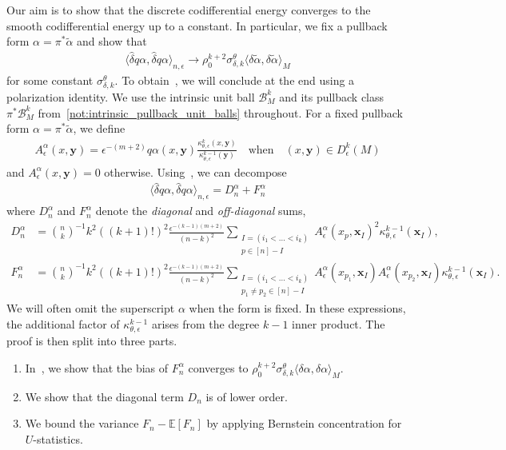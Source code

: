 \documentclass[11pt,reqno]{amsproc}
\numberwithin{equation}{section}
\newcommand{\E}{\mathbb{E}}
\newcommand{\bx}{\mathbf{x}}
\newcommand{\by}{\mathbf{y}}
\newcommand{\cB}{\mathcal{B}}
\newcommand{\talpha}{\tilde{\alpha}}
\newcommand{\hdelta}{\hat{\delta}}
\theoremstyle{definition}
\theoremstyle{plain}
\begin{document}
Our aim is to show that the discrete codifferential energy converges to the smooth codifferential energy up to a constant. In particular, we fix a pullback form $\alpha = \pi^*\talpha$ and show that
\begin{align} \label{eq:main_codiff_result}
    \langle \hdelta q \alpha, \hdelta q \alpha \rangle_{n,\epsilon} \to \rho_0^{k+2}\sigma^\theta_{\delta,k}\langle \delta \talpha, \delta \talpha \rangle_M
\end{align}
for some constant $\sigma_{\delta, k}^\theta$.
To obtain~, we will conclude at the end using a polarization identity.
We use the intrinsic unit ball $\cB_M^k$ and its pullback class $\pi^*\cB_M^k$ from~\eqref{not:intrinsic_pullback_unit_balls} throughout.
For a fixed pullback form $\alpha = \pi^*\talpha$, we define
\begin{align} \label{eq:A_epsilon}
    A_\epsilon^\alpha(x, \by) = \epsilon^{-(m+2)} q\alpha(x,\by) \frac{\kappa_{\theta, \epsilon}^k(x,\by)}{\kappa_{\theta,\epsilon}^{k-1}(\by)} \quad \text{when} \quad (x,\by) \in D^k_\epsilon(M)
\end{align}
and $A^\alpha_\epsilon(x,\by) = 0$ otherwise. 
Using~, we can decompose
\begin{align} \label{eq:codiff_inner_prod}
\langle \hdelta q \alpha, \hdelta q \alpha \rangle_{n,\epsilon} = D_n^\alpha + F_n^\alpha%
\end{align}
where $D_n^\alpha$ and $F_n^\alpha$ denote the \emph{diagonal} and \emph{off-diagonal} sums,
\begin{align}
    D_n^\alpha &= \binom{n}{k}^{-1} k^2((k+1)!)^2 \frac{\epsilon^{-(k-1)(m+2)}}{(n-k)^2}\sum_{\substack{I = (i_1 < \ldots < i_k) \\p \in [n]-I}} A^\alpha_\epsilon(x_{p}, \bx_I)^2  \kappa^{k-1}_{\theta, \epsilon}(\bx_I),  \label{eq:D_n}\\
    F_n^\alpha&= \binom{n}{k}^{-1} k^2((k+1)!)^2 \frac{\epsilon^{-(k-1)(m+2)}}{(n-k)^2} \sum_{\substack{I= (i_1 < \ldots < i_k)\\p_1 \neq p_2 \in [n] - I}} A^\alpha_\epsilon(x_{p_1}, \bx_I) A^\alpha_{\epsilon}(x_{p_2}, \bx_I) \kappa^{k-1}_{\theta, \epsilon}(\bx_I). \label{eq:F_n}
\end{align}
We will often omit the superscript $\alpha$ when the form is fixed. In these expressions, the additional factor of $\kappa^{k-1}_{\theta, \epsilon}$ arises from the degree $k-1$ inner product. The proof is then split into three parts.
\begin{enumerate}
    \item In~, we show that the bias of $F_n^\alpha$ converges to $\rho_0^{k+2}\sigma^\theta_{\delta,k}\langle \delta\alpha,\delta\alpha\rangle_M$.
    \item We show that the diagonal term $D_n$ is of lower order.
    \item We bound the variance $F_n-\E[F_n]$ by applying Bernstein concentration for $U$-statistics.
\end{enumerate}
\end{document}
